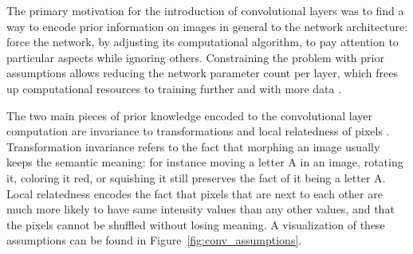 \documentclass{article}
\begin{document}
The primary motivation for the introduction of convolutional layers was to find a way to encode prior information 
on images in general to the network architecture: force the network, by adjusting its computational 
algorithm, to pay attention to particular aspects while ignoring others. Constraining the problem with 
 prior assumptions allows reducing the network parameter count per layer, which frees up 
computational resources to training further and with more data \cite{alexnet}.


The two main pieces of prior knowledge encoded to the convolutional layer computation
 are invariance to transformations and local relatedness of pixels \cite{princebook}.
Transformation invariance refers to the fact that morphing an image usually keeps the semantic meaning: for instance
 moving a letter A in an image, 
rotating it, coloring it red, or squishing it still preserves the fact of it being a letter A. Local relatedness 
encodes the fact that pixels that are next to each other are much more likely to have same intensity values than any other 
values, and that the pixels cannot be shuffled without losing meaning. A visualization of these assumptions can be found in 
Figure~\ref{fig:conv_assumptions}.
\end{document}
